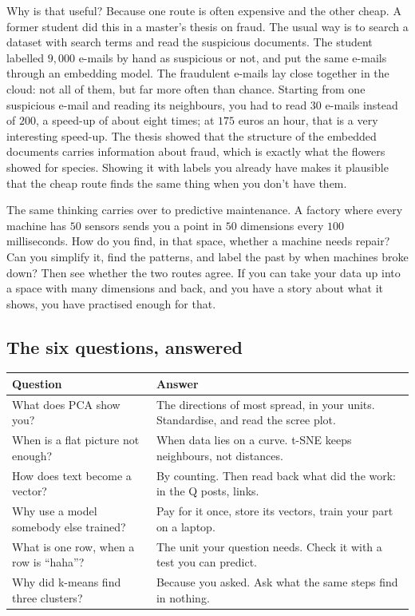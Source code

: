 \documentclass[12pt, a4paper]{article}
\theoremstyle{definition}
\theoremstyle{remark}
\begin{document}
Why is that useful? Because one route is often expensive and the other cheap. A former student did this in a master's thesis on fraud. The usual way is to search a dataset with search terms and read the suspicious documents. The student labelled $9{,}000$ e-mails by hand as suspicious or not, and put the same e-mails through an embedding model. The fraudulent e-mails lay close together in the cloud: not all of them, but far more often than chance. Starting from one suspicious e-mail and reading its neighbours, you had to read $30$ e-mails instead of $200$, a speed-up of about eight times; at $175$ euros an hour, that is a very interesting speed-up. The thesis showed that the structure of the embedded documents carries information about fraud, which is exactly what the flowers showed for species. Showing it with labels you already have makes it plausible that the cheap route finds the same thing when you don't have them.

The same thinking carries over to predictive maintenance. A factory where every machine has $50$ sensors sends you a point in $50$ dimensions every $100$ milliseconds. How do you find, in that space, whether a machine needs repair? Can you simplify it, find the patterns, and label the past by when machines broke down? Then see whether the two routes agree. If you can take your data up into a space with many dimensions and back, and you have a story about what it shows, you have practised enough for that.

\subsection{The six questions, answered}
\label{sec:lesson6-summary}
\begin{table}[H]
\centering
\begin{tabularx}{\textwidth}{@{}l X@{}}
\toprule
\textbf{Question} & \textbf{Answer} \\
\midrule
What does PCA show you? & The directions of most spread, in your units. Standardise, and read the scree plot. \\
When is a flat picture not enough? & When data lies on a curve. t-SNE keeps neighbours, not distances. \\
How does text become a vector? & By counting. Then read back what did the work: in the Q posts, links. \\
Why use a model somebody else trained? & Pay for it once, store its vectors, train your part on a laptop. \\
What is one row, when a row is ``haha''? & The unit your question needs. Check it with a test you can predict. \\
Why did k-means find three clusters? & Because you asked. Ask what the same steps find in nothing. \\
\bottomrule
\end{tabularx}
\end{table}
\end{document}
